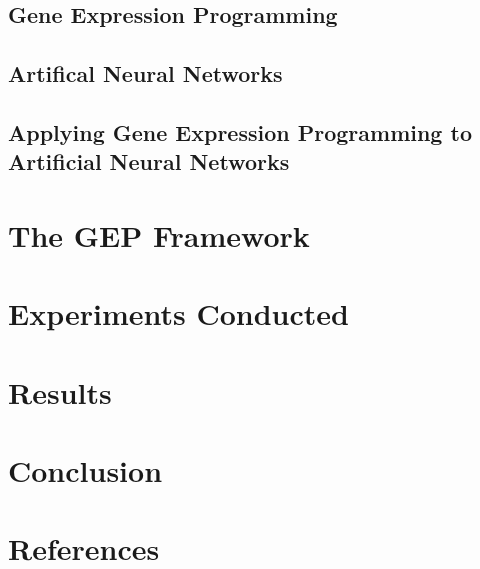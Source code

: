 \documentclass[a4paper,11pt]{report}
\begin{document}

\section{Gene Expression Programming}







\section{Artifical Neural Networks}







\section{Applying Gene Expression Programming to Artificial Neural Networks}




\chapter{The GEP Framework}









\chapter{Experiments Conducted}



\chapter{Results}




\chapter{Conclusion}


\chapter{References}

\end{document}
